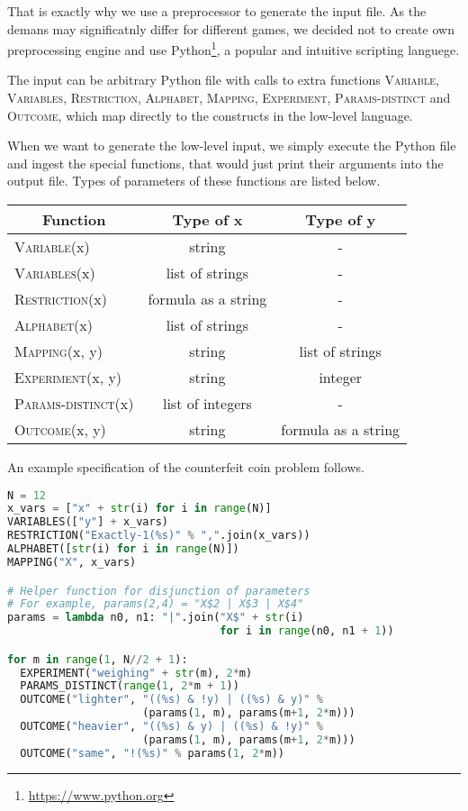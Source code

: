 That is exactly why we use a preprocessor to generate the input file.
As the demans may significatnly differ for different games,
  we decided not to create own preprocessing engine
  and use Python\footnote{\url{https://www.python.org}},
  a popular and intuitive scripting languege.

The input can be arbitrary Python file with calls to extra functions
\textsc{Variable}, \textsc{Variables}, \textsc{Restriction}, \textsc{Alphabet},
\textsc{Mapping}, \textsc{Experiment}, \textsc{Params-distinct} and \textsc{Outcome},
which map directly to the constructs in the low-level language.

When we want to generate the low-level input, we simply execute the Python file
and ingest the special functions, that would just print their arguments into
the output file. Types of parameters of these functions are listed below.

\begin{center}
\begin{tabular}{lcc}
 \multicolumn{1}{c}{\textbf{Function}} & \textbf{Type of x} & \textbf{Type of y} \\\hline
\textsc{Variable}(x) & string & - \\
\textsc{Variables}(x) & list of strings & -\\
\textsc{Restriction}(x) & formula as a string& -\\
\textsc{Alphabet}(x) & list of strings & -\\
\textsc{Mapping}(x, y) & string & list of strings\\
\textsc{Experiment}(x, y) & string & integer \\
\textsc{Params-distinct}(x) & list of integers & -\\
\textsc{Outcome}(x, y) & string & formula as a string
\end{tabular}
\end{center}

\begin{example}
An example specification of the counterfeit coin problem follows.
\begin{lstlisting}[language=Python]
N = 12
x_vars = ["x" + str(i) for i in range(N)]
VARIABLES(["y"] + x_vars)
RESTRICTION("Exactly-1(%s)" % ",".join(x_vars))
ALPHABET([str(i) for i in range(N)])
MAPPING("X", x_vars)

# Helper function for disjunction of parameters
# For example, params(2,4) = "X$2 | X$3 | X$4"
params = lambda n0, n1: "|".join("X$" + str(i)
                                 for i in range(n0, n1 + 1))

for m in range(1, N//2 + 1):
  EXPERIMENT("weighing" + str(m), 2*m)
  PARAMS_DISTINCT(range(1, 2*m + 1))
  OUTCOME("lighter", "((%s) & !y) | ((%s) & y)" %
                     (params(1, m), params(m+1, 2*m)))
  OUTCOME("heavier", "((%s) & y) | ((%s) & !y)" %
                     (params(1, m), params(m+1, 2*m)))
  OUTCOME("same", "!(%s)" % params(1, 2*m))
\end{lstlisting}
\end{example}



